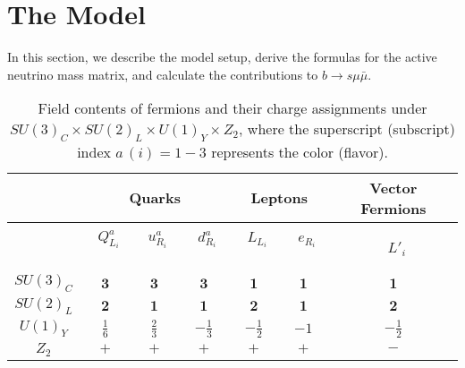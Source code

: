 \documentclass[%
showkeys,12pt,
preprint,preprintnumbers,nofootinbib,
groupedaddress,superscriptaddress,amsmath,amssymb]{revtex4}
\numberwithin{equation}{section}
\begin{document}
\section{The Model}

In this section, we describe the model setup, derive the formulas 
for the active neutrino mass matrix, and calculate the contributions
to $b\to s \mu \bar \mu$.

 \begin{widetext}
\begin{center} 
\begin{table}%
\begin{tabular}{|c||c|c|c||c|c||c|}\hline\hline  
&\multicolumn{3}{c||}{Quarks} & \multicolumn{2}{c||}{Leptons}& \multicolumn{1}{c|}{Vector Fermions} \\\hline
& ~$Q_{L_i}^a$~ & ~$u_{R_i}^a$~ & ~$d_{R_i}^a$ ~ 
& ~$L_{L_i}$~ & ~$e_{R_i}$ ~ & ~$L'_{i}$ 
\\\hline 
$SU(3)_C$ & $\bm{3}$  & $\bm{3}$  & $\bm{3}$  & $\bm{1}$& $\bm{1}$& $\bm{1}$   \\\hline 
$SU(2)_L$ & $\bm{2}$  & $\bm{1}$  & $\bm{1}$  & $\bm{2}$& $\bm{1}$& $\bm{2}$   \\\hline 
$U(1)_Y$ & $\frac16$ & $\frac23$  & $-\frac{1}{3}$  & $-\frac12$  & $-1$  & $-\frac12$\\\hline
$Z_2$ & $+$ & $+$  & $+$ & $+$ & $+$ & $-$  \\ \hline
\end{tabular}
\caption{Field contents of fermions
and their charge assignments under 
$SU(3)_C\times SU(2)_L\times U(1)_Y\times Z_2$, where the 
superscript (subscript) index $a\,(i)=1-3$ represents the color (flavor). }
\label{tab:1}
\end{table}
\end{center}
\end{widetext}
%
\begin{table}%
\caption{Field contents of bosons
and their charge assignments under  
$SU(3)_C\times SU(2)_L\times U(1)_Y\times Z_2$, 
where the superscript index $a=1-3$ represents the color. }
\label{tab:2}
\end{table}
%
\end{document}
